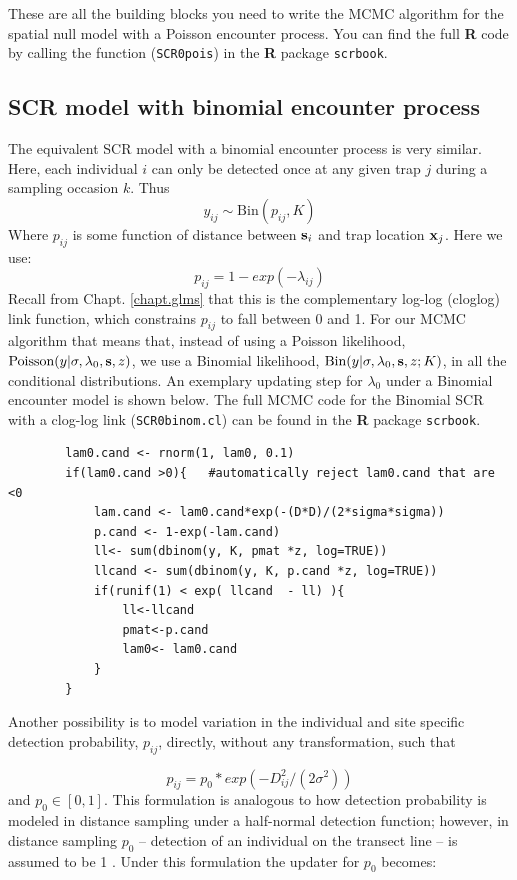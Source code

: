 These are all the building blocks you need to write the MCMC algorithm
for the spatial null model with a Poisson encounter process.  You can
find the full {\bf R} code by calling the function (\mbox{\tt SCR0pois}) in the {\bf R} package 
\mbox{\tt scrbook}.

\subsection{SCR model with binomial encounter process}
The equivalent SCR model with a binomial encounter process is very
similar. Here, each individual $i$ can only be detected once at any
given trap $j$ during a sampling occasion $k$.  Thus
\[
y_{ij} \sim \mbox{Bin} (p_{ij}, K)
\]
Where $p_{ij}$ is some function of distance between ${\bf s}_{i}$ and trap location ${\bf x}_{j}$. Here we use:
\[
p_{ij}=1-exp(-\lambda_{ij})
\]
Recall from Chapt. \ref{chapt.glms} that this is the complementary log-log (cloglog) link function, which constrains $p_{ij}$ 
to fall between 0 and 1.
For our MCMC algorithm that means that, instead of using a Poisson 
likelihood, $\mbox{Poisson}(y|\sigma,\lambda_0,{\bf s},z)$, we use a 
Binomial likelihood, $\mbox{Bin}(y| \sigma,\lambda_0,{\bf s},z; K)$, 
in all the conditional distributions. An exemplary updating step for $\lambda_0$ under a Binomial encounter model is shown below. 
The full MCMC code for the Binomial SCR with a clog-log link (\mbox{\tt SCR0binom.cl}) 
can be found in the {\bf R} package \mbox{\tt scrbook}.

\begin{verbatim}
        lam0.cand <- rnorm(1, lam0, 0.1)
        if(lam0.cand >0){   #automatically reject lam0.cand that are <0
            lam.cand <- lam0.cand*exp(-(D*D)/(2*sigma*sigma))
            p.cand <- 1-exp(-lam.cand)
            ll<- sum(dbinom(y, K, pmat *z, log=TRUE))  
            llcand <- sum(dbinom(y, K, p.cand *z, log=TRUE))
            if(runif(1) < exp( llcand  - ll) ){
                ll<-llcand
                pmat<-p.cand
                lam0<- lam0.cand
            }
        }
\end{verbatim}

Another possibility is to model variation in the individual and site 
specific detection probability,  $p_{ij}$, directly, without any 
transformation, such that

\[
p_{ij} = p_0 * exp(-D_{ij}^2/(2\sigma^2))
\]
and $p_0 \in [0,1]$.
This formulation is analogous to how detection probability is modeled 
in distance sampling under a half-normal detection function; however, 
in distance sampling $p_0$ -- detection of an individual on the transect 
line -- is assumed to be 1 \citep{buckland_etal:2001}. Under this 
formulation the updater for $p_0$ becomes:

